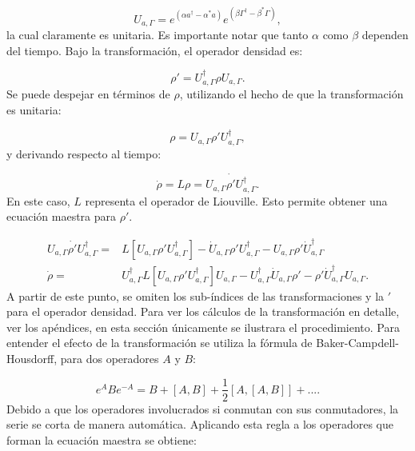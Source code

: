 \documentclass[a4paper,10pt]{report}
\begin{document}
\begin{equation}
U_{a,\Gamma} = e^{(\alpha a^\dagger - \alpha^*a)}e^{(\beta \Gamma^\dagger - \beta^*\Gamma)},
\end{equation}la cual claramente es unitaria. Es importante notar que tanto $\alpha$ como $\beta$ dependen del tiempo. Bajo la transformación, el operador densidad es:

\begin{equation}
\rho' = U_{a,\Gamma}^\dagger \rho U_{a,\Gamma}.
\end{equation} Se puede despejar en términos de $\rho$, utilizando el hecho de que la transformación es unitaria:

\begin{equation}
\rho = U_{a,\Gamma} \rho' U_{a,\Gamma}^\dagger,
\end{equation}y derivando respecto al tiempo:

\begin{equation}
\dot{\rho} = L\rho = \dot{U_{a,\Gamma} \rho' U_{a,\Gamma}^\dagger}.
\end{equation} En este caso, $L$ representa el operador de Liouville. Esto permite obtener una ecuación maestra para $\rho'$. 

\begin{align}
 U_{a,\Gamma} \dot{\rho'} U_{a,\Gamma}^\dagger =& L[U_{a,\Gamma} \rho' U_{a,\Gamma}^\dagger] - \dot{U}_{a,\Gamma}\rho'U_{a,\Gamma}^\dagger -U_{a,\Gamma} \rho' \dot{U}_{a,\Gamma}^\dagger\\
\dot{\rho} =& U_{a,\Gamma}^\dagger L[U_{a,\Gamma} \rho' U_{a,\Gamma}^\dagger]U_{a,\Gamma}-U_{a,\Gamma}^\dagger\dot{U}_{a,\Gamma}\rho'-\rho'\dot{U}_{a,\Gamma}^\dagger U_{a,\Gamma}.
\end{align}A partir de este punto, se omiten los sub-índices de las transformaciones y la $'$ para el operador densidad. Para ver los cálculos de la transformación en detalle, ver los apéndices, en esta sección únicamente se ilustrara el procedimiento. Para entender el efecto de la transformación se utiliza la fórmula de Baker-Campdell-Housdorff\cite{SakuraiQM}, para dos operadores $A$ y $B$:

\begin{equation}
e^{A} B e^{-A} = B + [A,B] + \frac{1}{2}[A,[A,B]] + ... .
\end{equation} Debido a que los operadores involucrados si conmutan con sus conmutadores, la serie se corta de manera automática. Aplicando esta regla a los operadores que forman la ecuación maestra se obtiene:
\end{document}
